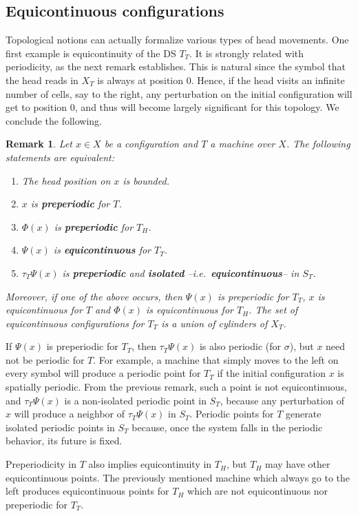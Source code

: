 \documentclass{llncs}
\newtheorem{rem}{Remark}
\newcommand{\ie}{\textit{i.e.}\ }
\begin{document}
\subsection{Equicontinuous configurations}\label{ss:eqpt}
Topological notions can actually formalize various types of head movements.
One first example is equicontinuity of the DS $T_T$.
It is strongly related with periodicity, as the next remark establishes.
This is natural since the symbol that the head reads in $X_T$ is always at position $0$.
Hence, if the head visits an infinite number of cells, say to the right, any perturbation on the initial configuration will get to position $0$, and thus will become largely significant for this topology.
We conclude the following. \begin{rem}\label{r:eqpt}
Let $x\in X$ be a configuration and $T$ a machine over $X$. The following statements are equivalent:
\begin{enumerate}
\item The head position on $x$ is bounded.
\item $x$ is \textbf{preperiodic} for $T$.
\item $\Phi(x)$ is \textbf{preperiodic} for $T_H$.
\item $\Psi(x)$ is \textbf{equicontinuous} for $T_T$.
\item $\tau_T\Psi(x)$ is \textbf{preperiodic} and \textbf{isolated} --\ie \textbf{equicontinuous}-- in $S_T$.
\end{enumerate}
Moreover, if one of the above occurs, then $\Psi(x)$ is preperiodic for $T_T$, $x$ is equicontinuous for $T$ and $\Phi(x)$ is equicontinuous for $T_H$.
The set of equicontinuous configurations for $T_T$ is a union of cylinders of $X_T$.
\end{rem}
If $\Psi(x)$ is preperiodic for $T_T$, then $\tau_T\Psi(x)$ is also periodic (for $\sigma$), but $x$ need not be periodic for $T$.
For example, a machine that simply moves to the left on every symbol will produce a periodic point for $T_T$ if the initial configuration $x$ is spatially periodic.
From the previous remark, such a point is not equicontinuous, and $\tau_T\Psi(x)$ is a non-isolated periodic point in $S_T$, because any perturbation of $x$ will produce a neighbor of $\tau_T\Psi(x)$ in $S_T$.
Periodic points for $T$ generate isolated periodic points in $S_T$ because, once the system falls in the periodic behavior, its future is fixed.

Preperiodicity in $T$ also implies equicontinuity in $T_H$, but $T_H$ may have other equicontinuous points.
The previously mentioned machine which always go to the left produces equicontinuous points for $T_H$ which are not equicontinuous nor preperiodic for $T_T$.
\end{document}
